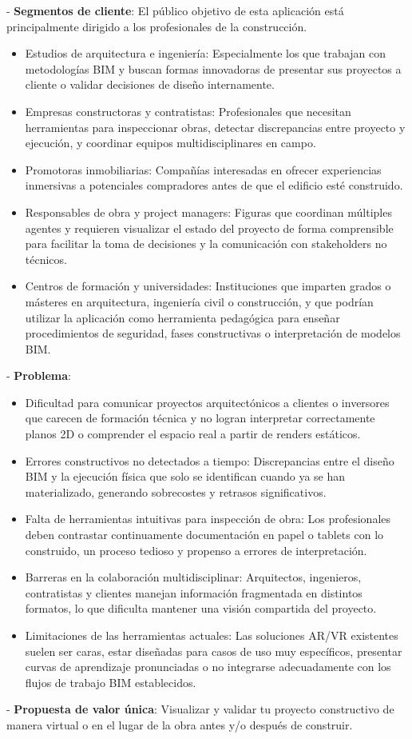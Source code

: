 - \textbf{Segmentos de cliente}: El público objetivo de esta aplicación está principalmente dirigido a los profesionales de la construcción.
\begin{itemize}
\item Estudios de arquitectura e ingeniería: Especialmente los que trabajan con metodologías BIM y buscan formas innovadoras de presentar sus proyectos a cliente o validar decisiones de diseño internamente.
\item Empresas constructoras y contratistas: Profesionales que necesitan herramientas para inspeccionar obras, detectar discrepancias entre proyecto y ejecución, y coordinar equipos multidisciplinares en campo.
\item Promotoras inmobiliarias: Compañías interesadas en ofrecer experiencias inmersivas a potenciales compradores antes de que el edificio esté construido.
\item Responsables de obra y project managers: Figuras que coordinan múltiples agentes y requieren visualizar el estado del proyecto de forma comprensible para facilitar la toma de decisiones y la comunicación con stakeholders no técnicos.
\item Centros de formación y universidades: Instituciones que imparten grados o másteres en arquitectura, ingeniería civil o construcción, y que podrían utilizar la aplicación como herramienta pedagógica para enseñar procedimientos de seguridad, fases constructivas o interpretación de modelos BIM.
\end{itemize}
- \textbf{Problema}:
\begin{itemize}
\item Dificultad para comunicar proyectos arquitectónicos a clientes o inversores que carecen de formación técnica y no logran interpretar correctamente planos 2D o comprender el espacio real a partir de renders estáticos.
\item Errores constructivos no detectados a tiempo: Discrepancias entre el diseño BIM y la ejecución física que solo se identifican cuando ya se han materializado, generando sobrecostes y retrasos significativos.
\item Falta de herramientas intuitivas para inspección de obra: Los profesionales deben contrastar continuamente documentación en papel o tablets con lo construido, un proceso tedioso y propenso a errores de interpretación.
\item Barreras en la colaboración multidisciplinar: Arquitectos, ingenieros, contratistas y clientes manejan información fragmentada en distintos formatos, lo que dificulta mantener una visión compartida del proyecto.
\item Limitaciones de las herramientas actuales: Las soluciones AR/VR existentes suelen ser caras, estar diseñadas para casos de uso muy específicos, presentar curvas de aprendizaje pronunciadas o no integrarse adecuadamente con los flujos de trabajo BIM establecidos.
\end{itemize}
- \textbf{Propuesta de valor única}: Visualizar y validar tu proyecto constructivo de manera virtual o en el lugar de la obra antes y/o después de construir.

